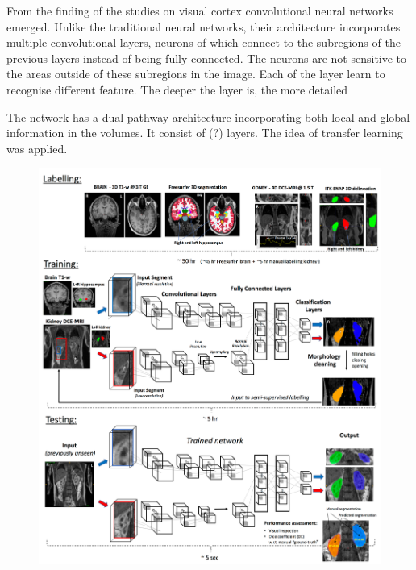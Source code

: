 From the finding of the studies on visual cortex convolutional neural networks emerged. Unlike the traditional neural networks, their architecture incorporates multiple convolutional layers, neurons of which  connect to the subregions of the previous layers instead of being fully-connected. The neurons are not sensitive to the areas outside of these subregions in the image.
Each of the layer learn to recognise different feature. The deeper the layer is, the more detailed 

The network has a dual pathway architecture incorporating both local and global information in the volumes. It consist of \color{red}(?) \color{black} layers.
The idea of transfer learning was applied. 

\begin{figure}
	\centering
	\includegraphics[width = \linewidth]{img/cnn}
	\caption{}
	\label{fig:cnn}
\end{figure}

